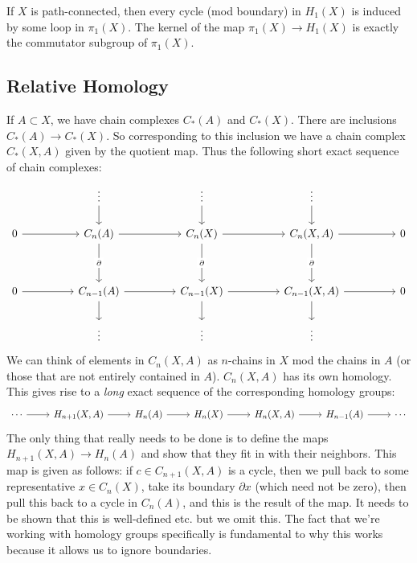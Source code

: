 \documentclass{amsart}
\begin{document}
	 If $X$ is path-connected, then every cycle (mod boundary) in $H_1(X)$ is induced by some loop in $\pi_1(X)$. The kernel of the map $\pi_1(X)\to H_1(X)$ is exactly the commutator subgroup of $\pi_1(X)$.\\
	 
	 \subsection{Relative Homology} If $A\subset X$, we have chain complexes $C_*(A)$ and $C_*(X)$. There are inclusions $C_*(A)\to C_*(X)$. So corresponding to this inclusion we have a chain complex $C_*(X,A)$ given by the quotient map. Thus the following short exact sequence of chain complexes:
	 $$
	 \begin{tikzcd}
	 	&& \vdots && \vdots && \vdots \\
	 	0 && {C_n(A)} && {C_n(X)} && {C_n(X,A)} && 0 \\
	 	\\
	 	0 && {C_{n-1}(A)} && {C_{n-1}(X)} && {C_{n-1}(X,A)} && 0 \\
	 	&& \vdots && \vdots && \vdots
	 	\arrow[from=1-3, to=2-3]
	 	\arrow[from=1-5, to=2-5]
	 	\arrow[from=1-7, to=2-7]
	 	\arrow[from=2-1, to=2-3]
	 	\arrow[from=2-3, to=2-5]
	 	\arrow["\partial"{description}, from=2-3, to=4-3]
	 	\arrow[from=2-5, to=2-7]
	 	\arrow["\partial"{description}, from=2-5, to=4-5]
	 	\arrow[from=2-7, to=2-9]
	 	\arrow["\partial"{description}, from=2-7, to=4-7]
	 	\arrow[from=4-1, to=4-3]
	 	\arrow[from=4-3, to=4-5]
	 	\arrow[from=4-3, to=5-3]
	 	\arrow[from=4-5, to=4-7]
	 	\arrow[from=4-5, to=5-5]
	 	\arrow[from=4-7, to=4-9]
	 	\arrow[from=4-7, to=5-7]
	 \end{tikzcd}
	 $$
	 We can think of elements in $C_n(X,A)$ as $n$-chains in $X$ mod the chains in $A$ (or those that are not entirely contained in $A$). $C_n(X,A)$ has its own homology. This gives rise to a \textit{long} exact sequence of the corresponding homology groups:
	 $$
	 \begin{tikzcd}
	 	\cdots & {H_{n+1}(X,A)} & {H_n(A)} & {H_n(X)} & {H_n(X,A)} & {H_{n-1}(A)} & \cdots
	 	\arrow[from=1-1, to=1-2]
	 	\arrow[from=1-2, to=1-3]
	 	\arrow[from=1-3, to=1-4]
	 	\arrow[from=1-4, to=1-5]
	 	\arrow[from=1-5, to=1-6]
	 	\arrow[from=1-6, to=1-7]
	 \end{tikzcd}
	 $$
	 The only thing that really needs to be done is to define the maps $H_{n+1}(X,A)\to H_n(A)$ and show that they fit in with their neighbors. This map is given as follows: if $c\in C_{n+1}(X,A)$ is a cycle, then we pull back to some representative $x\in C_{n}(X)$, take its boundary $\partial x$ (which need not be zero), then pull this back to a cycle in $C_n(A)$, and this is the result of the map. It needs to be shown that this is well-defined etc. but we omit this. The fact that we're working with homology groups specifically is fundamental to why this works because it allows us to ignore boundaries.
	 
\end{document}
